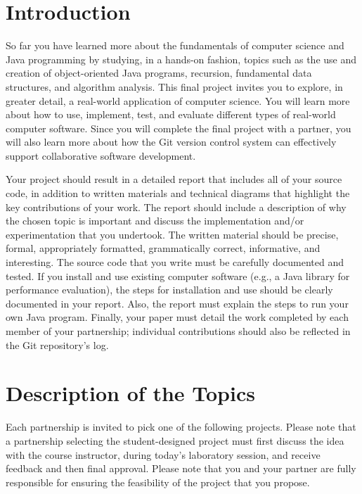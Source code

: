 

\usepackage[compact]{titlesec}


\vspace*{-.2in}

\section*{Introduction}

So far you have learned more about the fundamentals of computer science and Java programming by studying, in a hands-on
fashion, topics such as the use and creation of object-oriented Java programs, recursion, fundamental data structures,
and algorithm analysis. This final project invites you to explore, in greater detail, a real-world application of
computer science. You will learn more about how to use, implement, test, and evaluate different types of real-world
computer software. Since you will complete the final project with a partner, you will also learn more about how the Git
version control system can effectively support collaborative software development.

Your project should result in a detailed report that includes all of your source code, in addition to written materials
and technical diagrams that highlight the key contributions of your work. The report should include a description of
why the chosen topic is important and discuss the implementation and/or experimentation that you undertook. The written
material should be precise, formal, appropriately formatted, grammatically correct, informative, and interesting. The
source code that you write must be carefully documented and tested. If you install and use existing computer software
(e.g., a Java library for performance evaluation), the steps for installation and use should be clearly documented
in your report. Also, the report must explain the steps to run your own Java program. Finally, your paper must detail
the work completed by each member of your partnership; individual contributions should also be reflected in the Git
repository's log.

\section*{Description of the Topics}

Each partnership is invited to pick one of the following projects.  Please note that a partnership selecting the
student-designed project must first discuss the idea with the course instructor, during today's laboratory session, and
receive feedback and then final approval. Please note that you and your partner are fully responsible for ensuring the
feasibility of the project that you propose.

